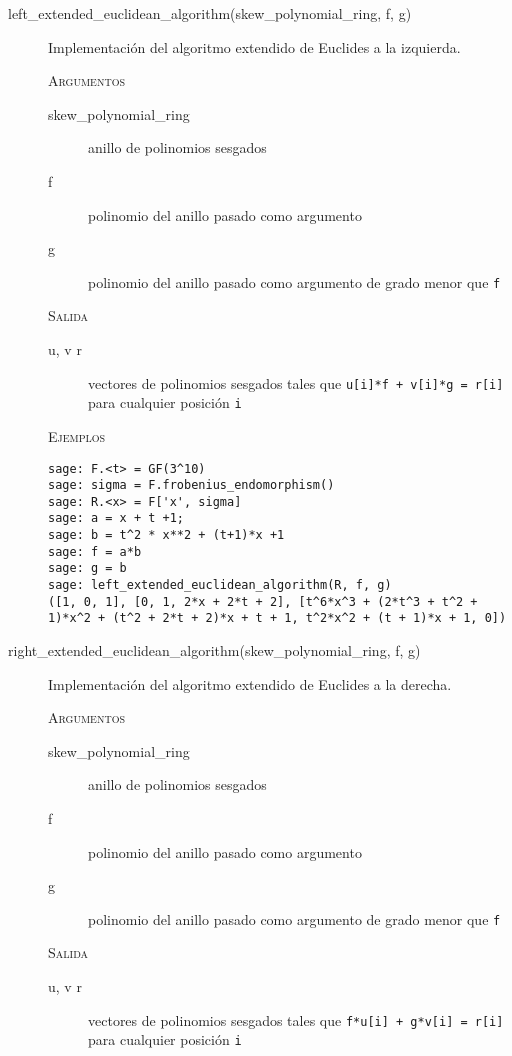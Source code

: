 \begin{description}
    \item[left\_extended\_euclidean\_algorithm(skew\_polynomial\_ring, f, g)]

    Implementación del algoritmo extendido de Euclides a la izquierda.

    \textsc{Argumentos}
    \begin{description}
        \item[skew\_polynomial\_ring] anillo de polinomios sesgados
        \item[f] polinomio del anillo pasado como argumento
        \item[g] polinomio del anillo pasado como argumento de grado menor que \texttt{f}
    \end{description}

    \textsc{Salida}
    \begin{description}
        \item[u, v r] vectores de polinomios sesgados tales que \texttt{u[i]*f + v[i]*g = r[i]} para cualquier posición \texttt{i}
    \end{description}

    \textsc{Ejemplos}
    \begin{lstlisting}
sage: F.<t> = GF(3^10)
sage: sigma = F.frobenius_endomorphism()
sage: R.<x> = F['x', sigma]
sage: a = x + t +1;
sage: b = t^2 * x**2 + (t+1)*x +1
sage: f = a*b
sage: g = b
sage: left_extended_euclidean_algorithm(R, f, g)
([1, 0, 1], [0, 1, 2*x + 2*t + 2], [t^6*x^3 + (2*t^3 + t^2 + 1)*x^2 + (t^2 + 2*t + 2)*x + t + 1, t^2*x^2 + (t + 1)*x + 1, 0])
    \end{lstlisting}

    \item[right\_extended\_euclidean\_algorithm(skew\_polynomial\_ring, f, g)]

    Implementación del algoritmo extendido de Euclides a la derecha.

    \textsc{Argumentos}
    \begin{description}
        \item[skew\_polynomial\_ring] anillo de polinomios sesgados
        \item[f] polinomio del anillo pasado como argumento
        \item[g] polinomio del anillo pasado como argumento de grado menor que \texttt{f}
    \end{description}

    \textsc{Salida}
    \begin{description}
        \item[u, v r] vectores de polinomios sesgados tales que \texttt{f*u[i] + g*v[i] = r[i]} para cualquier posición \texttt{i}
    \end{description}


\end{description}
